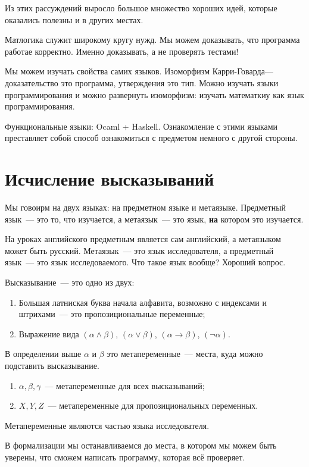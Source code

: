 Из этих рассуждений выросло большое множество хороших идей, 
которые оказались полезны и в других местах.

Матлогика служит широкому кругу нужд.
Мы можем доказывать, что программа работае корректно. 
Именно доказывать, а не проверять тестами!

Мы можем изучать свойства самих языков.
Изоморфизм Карри-Говарда--- доказательство это программа, утверждения это тип.
Можно изучать языки программирования и можно развернуть изоморфизм: изучать математкиу как язык программирования. 

Функциональные языки: Ocaml + Haskell. 
Ознакомление с этими языками преставляет собой способ ознакомиться с предметом немного с другой стороны.

\section{Исчисление высказываний}
Мы говоирм на двух языках: на предметном языке и метаязыке.
Предметный язык~--- это то, что изучается, а метаязык~--- это язык, \textbf{на} котором это изучается.

На уроках английского предметным является сам английский, а метаязыком может быть русский.
Метаязык~--- это язык исследователя, а предметный язык~--- это язык исследоваемого.
Что такое язык вообще? Хороший вопрос.

Высказывание~--- это одно из двух: 
\begin{enumerate}
\item Большая латниская буква начала алфавита, возможно с индексами и штрихами~--- это пропозициональные переменные;
\item Выражение вида $(\alpha \land \beta)$, $(\alpha \lor \beta)$, $(\alpha \to \beta)$, $(\neg \alpha)$. 
\end{enumerate}

В определении выше $\alpha$ и $\beta$ это метапеременные~--- места, куда можно подставить высказывание.
\begin{enumerate}
\item $\alpha, \beta, \gamma$~--- метапеременные для всех высказываний;
\item $X, Y, Z$~--- метапеременные для пропозициональных переменных.
\end{enumerate}

Метапеременные являются частью языка исследователя.

В формализации мы останавливаемся до места, в котором мы можем быть уверены, что сможем написать программу, которая всё проверяет.

